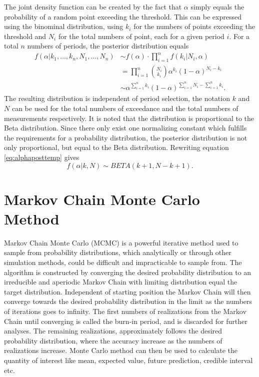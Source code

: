 The joint density function can be created by the fact that $\alpha$ simply equals the probability of a random point exceeding the threshold. This can be expressed using the binominal distribution, using $k_i$ for the numbers of points exceeding the threshold and $N_i$ for the total numbers of point, each for a given period $i$. For a total $n$ numbers of periods, the posterior distribution equals
\begin{align}
f(\alpha|k_1,\dotsc,k_n, N_1, \dotsc, N_n)&\sim f(\alpha)\cdot \prod_{i=1}^{n} f(k_i|N_i,\alpha)\nonumber\\
&=\prod_{i=1}^{n} \binom{N_i}{k_i} \alpha^{k_i}(1-\alpha)^{N_i-k_i}\nonumber\\
& \sim \alpha^{\sum_{i=1}^{n}k_i}(1-\alpha)^{\sum_{i=1}^{n}N_i-\sum_{i=1}^{n}k_i}.\label{eq:alphaposttemp}
\end{align}
The resulting distribution is independent of period selection, the notation $k$ and $N$ can be used for the total numbers of exceedance and the total numbers of measurements respectively. It is noted that the distribution is proportional to the Beta distribution. Since there only exist one normalizing constant which fulfills the requirements for a probability distribution, the posterior distribution is not only proportional, but equal to the Beta distribution. Rewriting equation \eqref{eq:alphaposttemp} gives
\begin{equation}
\label{eq:alphapost}
f(\alpha|k,N) \sim BETA(k+1,N-k+1).
\end{equation}

\section{Markov Chain Monte Carlo Method}
\label{ch:mcmc}
Markov Chain Monte Carlo (MCMC) is a powerful iterative method used to sample from probability distributions, which analytically or through other simulation methods, could be difficult and impracticable to sample from. The algorithm is constructed by converging the desired probability distribution to an irreducible and aperiodic Markov Chain with limiting distribution equal the target distribution. Independent of starting position the Markov Chain will then converge towards the desired probability distribution in the limit as the numbers of iterations goes to infinity. The first numbers of realizations from the Markov Chain until converging is called the burn-in period, and is discarded for further analyses. The remaining realizations, approximately follows the desired probability distribution, where the accuracy increase as the numbers of realizations increase. Monte Carlo method can then be used to calculate the quantity of interest like mean, expected value, future prediction, credible interval etc.
\cite[p.~201]{compstat}\\ %
\cite{MCMC}\\ %
\cite[p.220]{compstat}\\%


